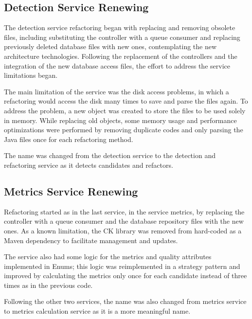 \subsection{Detection Service Renewing}
\label{sub-restruct-detection}

The detection service refactoring began with replacing and removing obsolete files, including substituting the controller with a queue consumer and replacing previously deleted database files with new ones, contemplating the new architecture technologies. Following the replacement of the controllers and the integration of the new database access files, the effort to address the service limitations began.

The main limitation of the service was the disk access problems, in which a refactoring would access the disk many times to save and parse the files again. To address the problem, a new object was created to store the files to be used solely in memory. While replacing old objects, some memory usage and performance optimizations were performed by removing duplicate codes and only parsing the Java files once for each refactoring method.

The name was changed from the detection service to the detection and refactoring service as it detects candidates and refactors.



\subsection{Metrics Service Renewing}
\label{sec-restruct-metrics}

Refactoring started as in the last service, in the service metrics, by replacing the controller with a queue consumer and the database repository files with the new ones. As a known limitation, the CK library \textcite{ck} was removed from hard-coded as a Maven dependency to facilitate management and updates. 

The service also had some logic for the metrics and quality attributes implemented in Enums; this logic was reimplemented in a strategy pattern and improved by calculating the metrics only once for each candidate instead of three times as in the previous code.

Following the other two services, the name was also changed from metrics service to metrics calculation service as it is a more meaningful name. 


